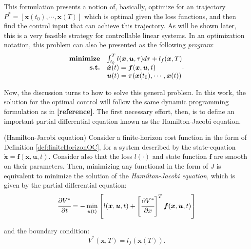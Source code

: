 \documentclass[a4paper,11pt]{book}
\numberwithin{figure}{chapter}
\numberwithin{equation}{chapter}
\numberwithin{table}{chapter}
\newtheorem{theorem}{Theorem}[chapter]
\theoremstyle{definition}
\newcounter{boxed-theorem}
\newenvironment{boxed-theorem}[1]
{\colorlet{shadecolor}{pastelBlue2!10} \begin{shaded} \begin{theorem}{#1}}
{\end{theorem} \end{shaded}}
\newcounter{boxed-definition}
\newcounter{boxed-example}
\begin{document}
This formulation presents a notion of, basically, optimize for an trajectory $P^* = [\bm{x}(t_0), \cdots, \bm{x}(T)]$ which is optimal given the loss functions, and then find the control input that can achieve this trajectory. As will be shown later, this is a very feasible strategy for controllable linear systems. In an optimization notation, this problem can also be presented as the following \textit{program}: 
\begin{align}
\begin{matrix*}[l]
    \textbf{minimize} & \int_{t_0}^T l(\bm{x}, \bm{u}, \tau) d \tau + l_f(\bm{x}, T) \\
    \hfill \textbf{s.t.} & \dot{\bm{x}}(t) = \bm{f}(\bm{x}, \bm{u}, t)  \\
                & \bm{u}(t) = \pi(\bm{x}(t_0), \cdots, \bm{x}(t))
\end{matrix*}
.\end{align}

Now, the discussion turns to how to solve this general problem. In this work, the solution for the optimal control will follow the same dynamic programming formulation as in \textbf{[reference]}. The first necessary effort, then, is to define an important partial differential equation known as the Hamilton-Jacobi equation.

\begin{boxed-theorem}{(Hamilton-Jacobi equation)} \label{th:hamiltonJacobi}
    Consider a finite-horizon cost function in the form of Definition \ref{def:finiteHorizonOC}, for a system described by the state-equation $\dot{\bm{x}} = \bm{f}(\bm{x}, \bm{u}, t)$. Consider also that the loss $l(\cdot)$ and state function $\bm{f}$ are smooth on their parameters. Then, minimizing any functional in the form of $J$ is equivalent to minimize the solution of the \textit{Hamilton-Jacobi equation}, which is given by the partial differential equation:
    \begin{equation} \label{eq:HJEquation}
        \cfrac{\partial V^*}{\partial t} = - \min_{u(t)} \left[ l(\bm{x}, \bm{u}, t) + \left[ \cfrac{\partial V^*}{\partial x} \right]^T \bm{f}(\bm{x}, \bm{u}, t)  \right]
    \end{equation}
    
    \noindent and the boundary condition:
    \begin{equation}
        V^*(\bm{x}, T) = l_f(\bm{x}(T))
    .\end{equation}
\end{boxed-theorem}
\end{document}
